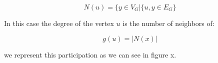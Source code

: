 \begin{equation}\label{eq:neighbors}
\displaystyle N(u)={\{y\in V_{G}|\{u,y}\in E_{G}\}
\end{equation}

In this case the degree of the vertex $u$ is the number of neighbors of: 

\begin{equation}\label{eq:degree}
\displaystyle g(u)=|N(x)|
\end{equation}

we represent this participation as we can see in figure x.









